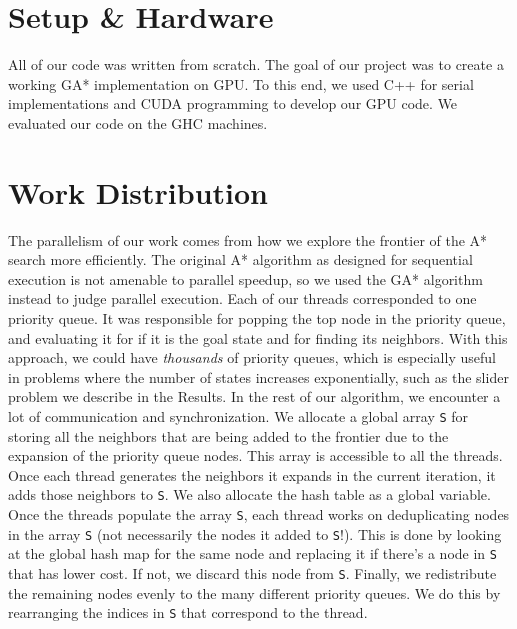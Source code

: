
\section{Setup \& Hardware}
All of our code was written from scratch.\newline\newline
The goal of our project was to create a working GA* implementation on GPU. To this end, we used C++ for serial implementations and CUDA programming to develop our GPU code. We evaluated our code on the GHC machines.\newline\newline

\section{Work Distribution}
The parallelism of our work comes from how we explore the frontier of the A* search more efficiently. The original A* algorithm as designed for sequential execution is not amenable to parallel speedup, so we used the GA* algorithm instead to judge parallel execution. \newline\newline
Each of our threads corresponded to one priority queue. It was responsible for popping the top node in the priority queue, and evaluating it for if it is the goal state and for finding its neighbors. With this approach, we could have \textit{thousands} of priority queues, which is especially useful in problems where the number of states increases exponentially, such as the slider problem we describe in the Results. In the rest of our algorithm, we encounter a lot of communication and synchronization. \newline\newline
We allocate a global array \verb|S| for storing all the neighbors that are being added to the frontier due to the expansion of the priority queue nodes. This array is accessible to all the threads. Once each thread generates the neighbors it expands in the current iteration, it adds those neighbors to \verb|S|.\newline\newline
We also allocate the hash table as a global variable. Once the threads populate the array \verb|S|, each thread works on deduplicating nodes in the array \verb|S| (not necessarily the nodes it added to \verb|S|!). This is done by looking at the global hash map for the same node and replacing it if there's a node in \verb|S| that has lower cost. If not, we discard this node from \verb|S|. \newline\newline
Finally, we redistribute the remaining nodes evenly to the many different priority queues. We do this by rearranging the indices in \verb|S| that correspond to the thread.

